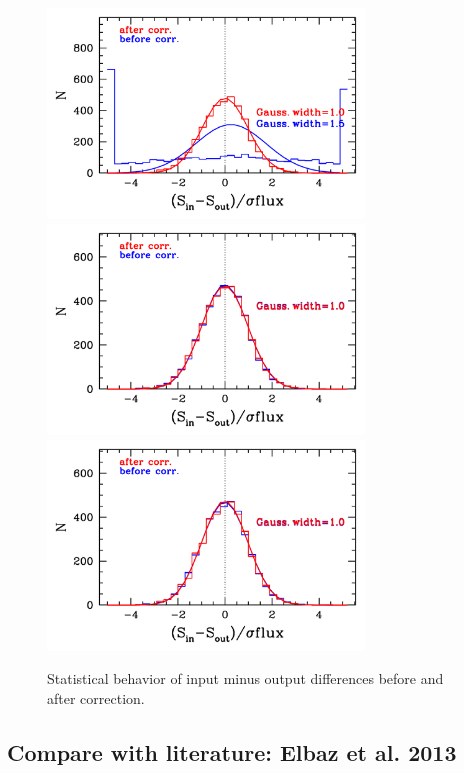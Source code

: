 \documentclass[11pt,a4paper]{article}
\begin{document}
\begin{figure}[H]
	\includegraphics[width=0.75\textwidth]{galsim_20cm_hist_dfcorr_1}
	\includegraphics[width=0.75\textwidth]{galsim_20cm_hist_dfcorr_2}
	\includegraphics[width=0.75\textwidth]{galsim_20cm_hist_dfcorr_3}
	\caption{Statistical behavior of input minus output differences before and after correction.}
\end{figure}

\subsection{Compare with literature: Elbaz et al. 2013}
\end{document}
